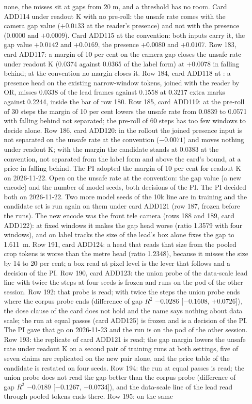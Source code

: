 none, the misses sit at gaps from 20 m, and a threshold has no room. Card ADD114 under readout K with no pre-roll: the unsafe rate comes with the camera gap value ($+0.0133$ at the reader's presence) and not with the presence (0.0000 and $+0.0009$). Card ADD115 at the convention: both inputs carry it, the gap value $+0.0142$ and $+0.0169$, the presence $+0.0080$ and $+0.0107$. Row 183, card ADD117: a margin of 10 per cent on the camera gap closes the unsafe rate under readout K (0.0374 against 0.0365 of the label form) at $+0.0078$ in falling behind; at the convention no margin closes it. Row 184, card ADD118 at : a presence head on the existing narrow-window tokens, joined with the reader by OR, misses 0.0338 of the lead frames against 0.1558 at 0.3217 extra marks against 0.2244, inside the bar of row 180. Row 185, card ADD119: at the pre-roll of 30 steps the margin of 10 per cent lowers the unsafe rate from 0.0839 to 0.0571 with falling behind not separated; the pre-roll of 60 steps has too few windows to decide alone. Row 186, card ADD120: in the rollout the joined presence input is not separated on the unsafe rate at the convention ($-0.0071$) and moves nothing under readout K; with the margin the candidate stands at 0.0383 at the convention, not separated from the label form and above the card's bound, at a price in falling behind. The PI adopted the margin of 10 per cent for readout K on 2026-11-22. Open on the unsafe rate at the convention: the gap value (a new encode) and the number of model seeds, both decisions of the PI. The PI decided both on 2026-11-22. Two more model seeds of the 10k line are in training and the candidate set is run again on them under card ADD121 (row 187, frozen before the runs). The new encode was the front tele camera (rows 188 and 189, card ADD122): at fixed windows it makes the gap head worse (ratio 1.3579 with four windows), and on label tracks the size of the lead's box alone fixes the gap to 1.611~m. Row 191, card ADD124: a head that reads that size from the pooled crop tokens is worse than the metre head (ratio 1.2348), because it misses the size by 14 to 20 per cent; a box read at pixel level is the lever that follows and a decision of the PI. Row 190, card ADD123: the union probe of the data-scale lead line with twice the steps at four seeds is frozen and runs on the pod of the other session. Row 192: that probe is read; with twice the steps the union probe ends where the corpus probe ends (difference of gap $R^2$ $-0.0286$ [$-0.1608$, $+0.0726$]), the dose clause of the card does not hold and the name says nothing about data scale; the run at equal passes (card ADD125) is frozen and is a decision of the PI. The PI gave that go on 2026-11-23 and the run is on the pod of the other session. Row 193: the replicate of card ADD121 is read; the gap margin lowers the unsafe rate under readout K on a second pair of training runs at both settings, five of seven claims are replicated on the new pair alone, and the price table of the candidate is restated on four seeds. Row 194: the run at equal passes is read; the union probe does not read the gap better than the corpus probe (difference of gap $R^2$ $-0.0189$ [$-0.1267$, $+0.0734$]), and the data-scale line of the lead read through pooled tokens ends there. Row 195: on the same 